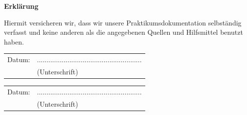 \documentclass[12pt,a4paper,bibliography=totocnumbered,listof=totocnumbered]{scrartcl}
\begin{document}
\pagebreak


\thispagestyle{empty}
\begin{center}
	\vspace*{5em}
	\huge\textbf{Erklärung}\\
\end{center}
\vspace{2em}
Hiermit versicheren wir, dass wir unsere Praktikumsdokumentation selbständig verfasst und keine anderen als die angegebenen Quellen und Hilfsmittel benutzt haben.

\vspace{4em}
\begin{minipage}{\linewidth}
	\begin{tabular}{p{15em}p{15em}}
		Datum: &  .......................................................\\
		& \centering (Unterschrift)\\
	\end{tabular}
	\begin{tabular}{p{15em}p{15em}}
		Datum: &  .......................................................\\
		& \centering (Unterschrift)\\
	\end{tabular}
\end{minipage}
\end{document}
